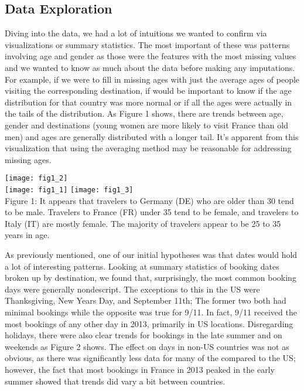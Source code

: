 \documentclass[a4paper, 11pt]{article}
\begin{document}
\subsection*{Data Exploration}

\par
Diving into the data, we had a lot of intuitions we wanted to confirm via visualizations or summary statistics. The most important of these was patterns involving age and gender as those were the features with the most missing values and we wanted to know as much about the data before making any imputations. For example, if we were to fill in missing ages with just the average ages of people visiting the corresponding destination, if would be important to know if the age distribution for that country was more normal or if all the ages were actually in the tails of the distribution. As Figure 1 shows, there are trends between age, gender and destinations (young women are more likely to visit France than old men) and ages are generally distributed with a longer tail. It’s apparent from this visualization that using the averaging method may be reasonable for addressing missing ages.

\begin{center}
\texttt{[image: fig1\_2]} \\
\texttt{[image: fig1\_1]}
\texttt{[image: fig1\_3]} \\
Figure 1: It appears that travelers to Germany (DE) who are older than 30 tend to be male. Travelers to France (FR) under 35 tend to be female, and travelers to Italy (IT) are mostly female. The majority of travelers appear to be 25 to 35 years in age.
\end{center}

\par
As previously mentioned, one of our initial hypotheses was that dates would hold a lot of interesting patterns. Looking at summary statistics of booking dates broken up by destination, we found that, surprisingly, the most common booking days were generally nondescript. The exceptions to this in the US were Thanksgiving, New Years Day, and September 11th; The former two both had minimal bookings while the opposite was true for 9/11. In fact, 9/11 received the most bookings of any other day in 2013, primarily in US locations. Disregarding holidays, there were also clear trends for bookings in the late summer and on weekends as Figure 2 shows. The effect on days in non-US countries was not as obvious, as there was significantly less data for many of the compared to the US; however, the fact that most bookings in France in 2013 peaked in the early summer showed that trends did vary a bit between countries.
\end{document}

